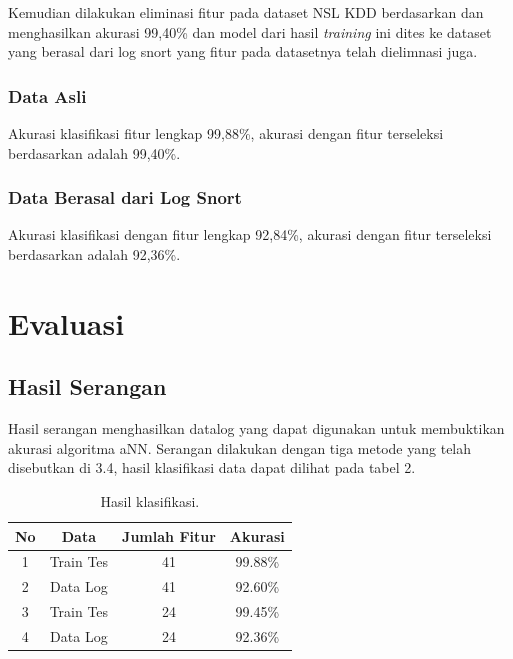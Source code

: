 Kemudian dilakukan eliminasi fitur pada dataset NSL KDD berdasarkan \cite{kdd99_feature} dan menghasilkan akurasi 99,40\% dan model dari hasil \textit{training} ini dites ke dataset yang berasal dari log snort yang fitur pada datasetnya telah dielimnasi juga.

\subsubsection{Data Asli}
Akurasi klasifikasi fitur lengkap 99,88\%, akurasi dengan fitur terseleksi berdasarkan \cite{kdd99_feature} adalah 99,40\%.

\subsubsection{Data Berasal dari Log Snort}
Akurasi klasifikasi dengan fitur lengkap 92,84\%, akurasi dengan fitur terseleksi berdasarkan \cite{kdd99_feature} adalah 92,36\%.



\section{Evaluasi}
\subsection{Hasil Serangan}
Hasil serangan menghasilkan datalog yang dapat digunakan untuk membuktikan akurasi algoritma aNN. Serangan dilakukan dengan tiga metode yang telah disebutkan di 3.4, hasil klasifikasi data dapat dilihat pada tabel 2.

\begin{table}[h]
\begin{center}
\begin{tabular}{|c|c|c|c|}
\hline
No & Data      & Jumlah Fitur & Akurasi \\ \hline
1  & Train Tes & 41           & 99.88\% \\ \hline
2  & Data Log  & 41           & 92.60\% \\ \hline
3  & Train Tes & 24           & 99.45\% \\ \hline
4  & Data Log  & 24           & 92.36\% \\ \hline
\end{tabular}
\caption{\label{tab:table-name}Hasil klasifikasi.}
\end{center}
\end{table}

